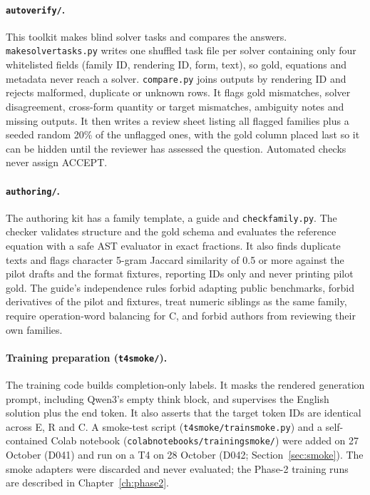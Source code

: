 \documentclass[12pt,a4paper,oneside]{report}
\renewcommand{\_}{\oldunderscore\allowbreak}
\begin{document}
\paragraph{\texttt{autoverify/}.} \label{sec:autoverify}This toolkit makes blind solver tasks and compares the answers. \texttt{make\_solver\_tasks.py} writes one shuffled task file per solver containing only four whitelisted fields (family ID, rendering ID, form, text), so gold, equations and metadata never reach a solver. \texttt{compare.py} joins outputs by rendering ID and rejects malformed, duplicate or unknown rows. It flags gold mismatches, solver disagreement, cross-form quantity or target mismatches, ambiguity notes and missing outputs. It then writes a review sheet listing all flagged families plus a seeded random 20\% of the unflagged ones, with the gold column placed last so it can be hidden until the reviewer has assessed the question. Automated checks never assign ACCEPT.

\paragraph{\texttt{authoring/}.} \label{sec:authoring}The authoring kit has a family template, a guide and \texttt{check\_family.py}. The checker validates structure and the gold schema and evaluates the reference equation with a safe AST evaluator in exact fractions. It also finds duplicate texts and flags character 5-gram Jaccard similarity of 0.5 or more against the pilot drafts and the format fixtures, reporting IDs only and never printing pilot gold. The guide's independence rules forbid adapting public benchmarks, forbid derivatives of the pilot and fixtures, treat numeric siblings as the same family, require operation-word balancing for C, and forbid authors from reviewing their own families.

\paragraph{Training preparation (\texttt{t4\_smoke/}).} The training code builds completion-only labels. It masks the rendered generation prompt, including Qwen3's empty think block, and supervises the English solution plus the end token. It also asserts that the target token IDs are identical across E, R and C. A smoke-test script (\texttt{t4\_smoke/train\_smoke.py}) and a self-contained Colab notebook (\texttt{colab\_notebooks/training\_smoke/}) were added on 27 October (D041) and run on a T4 on 28 October (D042; Section~\ref{sec:smoke}). The smoke adapters were discarded and never evaluated; the Phase-2 training runs are described in Chapter~\ref{ch:phase2}.
\end{document}

